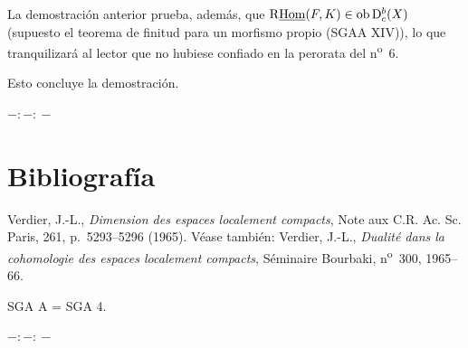 La demostración anterior prueba, además, que $\mathrm{R}\underline{\operatorname{Hom}}(F,K)\in\operatorname{ob}\mathrm{D}_c^b(X)$ (supuesto el teorema de finitud para un morfismo propio (SGAA XIV)), lo que tranquilizará al lector que no hubiese confiado en la perorata del n\textsuperscript{o}~6.

Esto concluye la demostración.

\begin{center}
$-:\!-:\!-$
\end{center}

\section*{Bibliografía}

\begin{enumerate}[label={[\arabic*]}]
\item Verdier, J.-L., \emph{Dimension des espaces localement compacts}, Note aux C.R. Ac. Sc. Paris, 261, p.~5293--5296 (1965). Véase también: Verdier, J.-L., \emph{Dualité dans la cohomologie des espaces localement compacts}, Séminaire Bourbaki, n\textsuperscript{o}~300, 1965--66.
\end{enumerate}

SGA A = SGA 4.

\begin{center}
$-:\!-:\!-$
\end{center}
